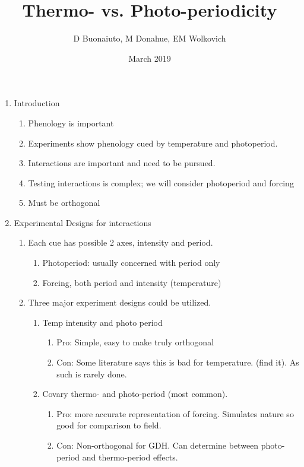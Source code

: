 \documentclass[12pt]{article}\usepackage[]{graphicx}\usepackage[]{color}
\title{Thermo- vs. Photo-periodicity}
\author{D Buonaiuto, M Donahue, EM Wolkovich}
\date{March 2019}
\begin{document}
\maketitle
\begin{enumerate}
    \item Introduction
    \begin{enumerate}
        \item Phenology is important
        \item Experiments show phenology cued by temperature and photoperiod.
        \item Interactions are important and need to be pursued.
         \item Testing interactions is complex; we will consider photoperiod and forcing
        \item Must be orthogonal
    \end{enumerate}
    \item Experimental Designs for interactions
    \begin{enumerate}
        \item Each cue has possible 2 axes, intensity and period.
        \begin{enumerate}
            \item Photoperiod: usually concerned with period only
            \item Forcing, both period and intensity (temperature)
        \end{enumerate}
        \item Three major experiment designs could be utilized.
        \begin{enumerate}
            \item Temp intensity and photo period
            \begin{enumerate}
                \item Pro: Simple, easy to make truly orthogonal
                \item Con: Some literature says this is bad for temperature. (find it). As such is rarely done.
            \end{enumerate}
            \item Covary thermo- and photo-period (most common).
            \begin{enumerate}
               \item Pro: more accurate representation of forcing. Simulates nature so good for comparison to field.
                \item Con: Non-orthogonal for GDH. Can determine between photo-period and thermo-period effects.
            \end{enumerate}
          

\end{enumerate}
\end{enumerate}
\end{enumerate}
\end{document}
